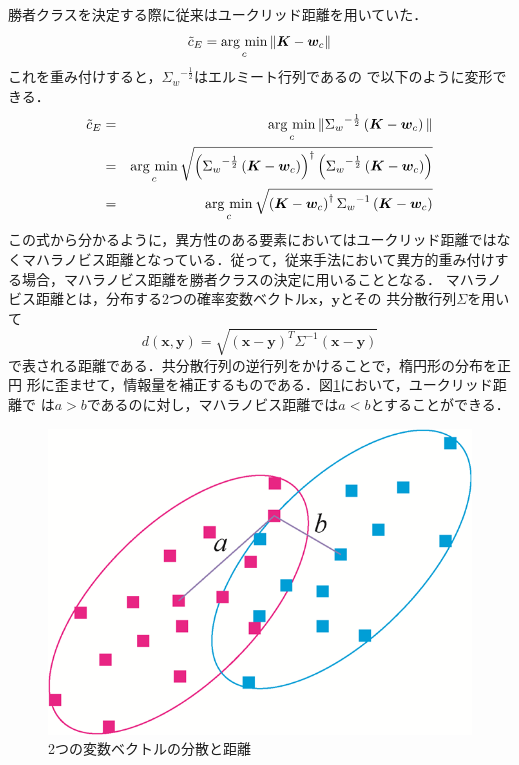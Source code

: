 ﻿\documentclass[12pt,oneside]{jsbook}
\newcommand{\argmin}{\mathop{\rm arg~min}\limits}
\begin{document}
勝者クラスを決定する際に従来はユークリッド距離を用いていた．
\begin{equation}
\tilde{c}_E = \argmin_{c} \|{\bm K} - {\bm w_c} \|\label{192027_15Feb15}
\end{equation}
これを重み付けすると，${\Sigma_w}^{-\frac{1}{2}}$はエルミート行列であるの
で以下のように変形できる．
\begin{eqnarray}
\tilde{c}_E&=&\argmin_{c} \|{\Sigma_w}^{-\frac{1}{2}}\left({\bm K} -
						      {\bm w_c}\right)\|\\
 &=&\argmin_{c} \sqrt{\left({\Sigma_w}^{-\frac{1}{2}}\left({\bm K} -
						      {\bm w_c}\right)
		      \right)^{\dagger}
                \left({\Sigma_w}^{-\frac{1}{2}}\left({\bm K} - {\bm
						w_c}\right)\right)}\\
 &=&\argmin_{c} \sqrt{\left({\bm K} - {\bm w_c}\right)^{\dagger}
    {\Sigma_w}^{-1}\left({\bm K} - {\bm w_c}\right)}
\end{eqnarray}
この式から分かるように，異方性のある要素においてはユークリッド距離ではな
くマハラノビス距離となっている．従って，従来手法において異方的重み付けす
る場合，マハラノビス距離を勝者クラスの決定に用いることとなる．
マハラノビス距離とは，分布する2つの確率変数ベクトル${\bm x}，{\bm y}$とその
共分散行列$\Sigma$を用いて
\[
 d({\bm x},{\bm y}) = \sqrt{\left({\bm x}-{\bm
 y}\right)^T\Sigma^{-1}\left({\bm x}-{\bm y}\right)}
\]
で表される距離である．共分散行列の逆行列をかけることで，楕円形の分布を正円
形に歪ませて，情報量を補正するものである．図\ref{maha}において，ユークリッド距離で
は$a>b$であるのに対し，マハラノビス距離では$a<b$とすることができる．

\begin{figure}[btp]
 \begin{center}
\includegraphics[width =\hsize ]{maha.png}
\caption{2つの変数ベクトルの分散と距離}
\label{maha}
  \end{center}
\end{figure}
\end{document}
